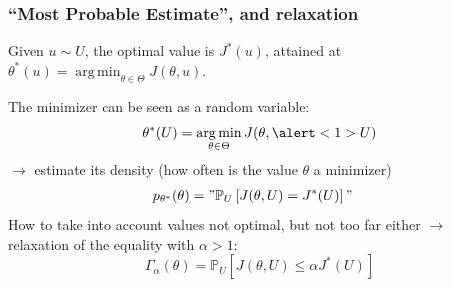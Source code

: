 \documentclass[11pt]{beamer}
\newcommand{\Prob}{\mathbb{P}}
\DeclareMathOperator*{\argmin}{arg\,min}
\newcommand{\kk}{\theta}
\newcommand{\uu}{u}
\newcommand{\UU}{U}
\newcommand{\Kspace}{\Theta}
\begin{document}
\appendix


\begin{frame}
  \frametitle{``Most Probable Estimate'', and relaxation}%


  Given $\uu \sim \UU$, the optimal value is $J^*(\uu)$, attained at
  $\kk^*(\uu) = \argmin_{\kk\in\Kspace} J(\kk,\uu)$.
  \pause

  
      The minimizer can be seen as a random variable:
      \begin{equation*}
        \kk^*(\UU) = \argmin_{\kk\in\Kspace} J(\kk,\alert<1>{\UU})
      \end{equation*}
      $\longrightarrow$ estimate its density (how often is the value $\kk$ a minimizer)
      \begin{align*}
        p_{\kk^*}(\kk)%
                                               &= "\Prob_{\UU}\left[J(\kk,\UU)= J^*(\UU) \right]"                                               %
      \end{align*}
      \pause
      How to take into account values not optimal, but not too far either
      $\longrightarrow$ relaxation of the equality with $\alpha> 1$:
      \begin{equation*}
        \Gamma_{\alpha}(\kk) = \Prob_{\UU}\left[J(\kk,\UU) \leq \alpha J^*(\UU) \right]
      \end{equation*}
\end{frame}
\end{document}
